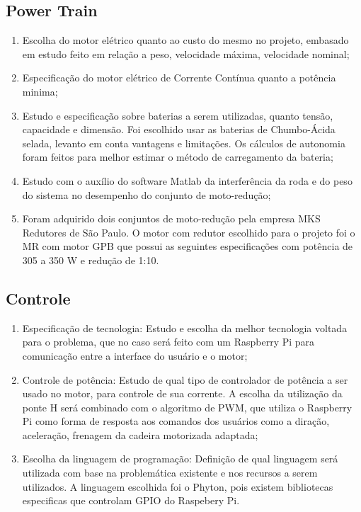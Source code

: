   \subsection{Power Train}
    \begin{enumerate}
      \item Escolha do motor elétrico quanto ao custo do mesmo no projeto, embasado em estudo feito em relação a peso, velocidade máxima, velocidade nominal;
      \item Especificação do motor elétrico de Corrente Contínua quanto a potência minima;
      \item Estudo e especificação sobre baterias a serem utilizadas, quanto tensão, capacidade e dimensão. Foi escolhido usar as baterias de Chumbo-Ácida selada, levanto em conta vantagens e limitações. Os cálculos de autonomia foram feitos para melhor estimar o método de carregamento da bateria;

 	\item Estudo com o auxílio do software Matlab da interferência da roda e do peso do sistema no desempenho do conjunto de moto-redução;
 	\item Foram adquirido dois conjuntos de moto-redução  pela empresa MKS Redutores de São Paulo. O motor com redutor escolhido para o projeto foi o MR com motor GPB que possui as seguintes especificações com potência de 305 a 350 W e redução de 1:10.

    \end{enumerate}

    \subsection{Controle}
      \begin{enumerate}
        \item Especificação de tecnologia: Estudo e escolha da melhor tecnologia voltada para o problema, que no caso será feito com um Raspberry Pi para comunicação entre a interface do usuário e o motor;

        \item Controle de potência: Estudo de qual tipo de controlador de potência a ser usado no motor, para controle de sua corrente. A escolha da utilização da ponte H será combinado com o algoritmo de PWM, que utiliza o Raspberry Pi como forma de resposta aos comandos dos usuários como a diração, aceleração, frenagem da cadeira motorizada adaptada;

        \item Escolha da linguagem de programação: Definição de qual linguagem será utilizada com base na problemática existente e nos recursos a serem utilizados. A linguagem escolhida foi o Phyton, pois existem bibliotecas especificas que controlam GPIO do Raspebery Pi.

      \end{enumerate}


